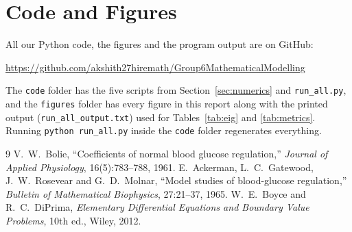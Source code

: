 \documentclass[11pt,a4paper]{article}
\newcommand{\repourl}{https://github.com/akshith27hiremath/Group6MathematicalModelling}
\begin{document}
\section{Code and Figures}\label{sec:repo}
All our Python code, the figures and the program output are on GitHub:
\begin{center}
\url{\repourl}
\end{center}
The \texttt{code} folder has the five scripts from Section~\ref{sec:numerics} and \texttt{run\_all.py}, and the \texttt{figures} folder has every figure in this report along with the printed output (\texttt{run\_all\_output.txt}) used for Tables~\ref{tab:eig} and \ref{tab:metrics}. Running \texttt{python run\_all.py} inside the \texttt{code} folder regenerates everything.

\begin{thebibliography}{9}
 V.~W.~Bolie, ``Coefficients of normal blood glucose regulation,'' \emph{Journal of Applied Physiology}, 16(5):783--788, 1961.
 E.~Ackerman, L.~C.~Gatewood, J.~W.~Rosevear and G.~D.~Molnar, ``Model studies of blood-glucose regulation,'' \emph{Bulletin of Mathematical Biophysics}, 27:21--37, 1965.
 W.~E.~Boyce and R.~C.~DiPrima, \emph{Elementary Differential Equations and Boundary Value Problems}, 10th ed., Wiley, 2012.
\end{thebibliography}
\end{document}
